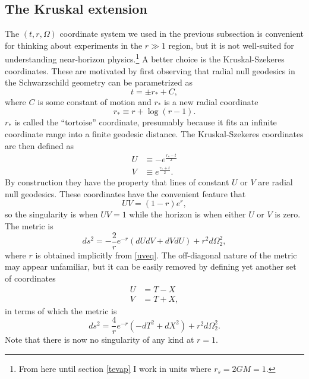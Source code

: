 \documentclass[12pt]{article}
\newcommand{\be}{\begin{equation}}
\newcommand{\ee}{\end{equation}}
\begin{document}
\subsection{The Kruskal extension}\label{krusksec}
The $(t,r,\Omega)$ coordinate system we used in the previous subsection is convenient for thinking about experiments in the $r\gg 1$ region, but it is not well-suited for understanding near-horizon physics.\footnote{From here until section \ref{tevap} I work in units where $r_s=2GM=1$.}  A better choice is the Kruskal-Szekeres coordinates.  These are motivated by first observing that radial null geodesics in the Schwarzschild geometry can be parametrized as 
\be\label{nullg}
t=\pm r_*+C,
\ee
where $C$ is some constant of motion and $r_*$ is a new radial coordinate
\be
r_*\equiv r+\log(r-1).
\ee
$r_*$ is called the ``tortoise'' coordinate, presumably because it fits an infinite coordinate range into a finite geodesic distance.  The Kruskal-Szekeres coordinates are then defined as
\begin{align}\label{UVK}
U&\equiv -e^{\frac{r_*-t}{2}}\\
V&\equiv e^{\frac{r_*+t}{2}}.
\end{align}
By construction they have the property that lines of constant $U$ or $V$ are radial null geodesics.  These coordinates have the convenient feature that 
\be\label{uveq}
UV=(1-r)e^r,
\ee 
so the singularity is when $UV=1$ while the horizon is when either $U$ or $V$ is zero.  The metric is
\be
ds^2=-\frac{2}{r}e^{-r}\left(dUdV+dVdU\right)+r^2 d\Omega_2^2,
\ee
where $r$ is obtained implicitly from \eqref{uveq}.  The off-diagonal nature of the metric may appear unfamiliar, but it can be easily removed by defining yet another set of coordinates
\begin{align}\nonumber
U&=T-X\\
V&=T+X,
\end{align}
in terms of which the metric is
\be\label{TXmet}
ds^2=\frac{4}{r}e^{-r}\left(-dT^2+dX^2\right)+r^2 d\Omega_2^2.
\ee
Note that there is now no singularity of any kind at $r=1$.  
\end{document}
